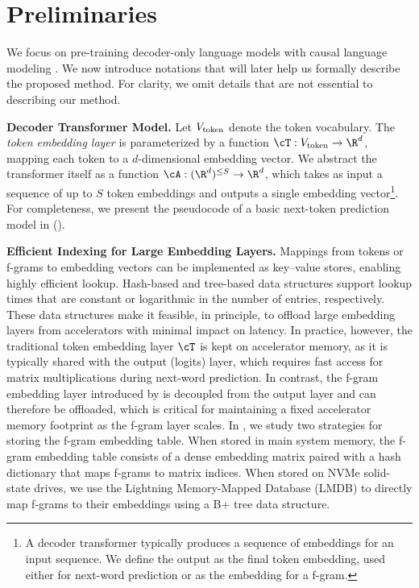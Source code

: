 


\section{Preliminaries}\label{sec:preliminary}

We focus on pre-training decoder-only language models with causal language modeling \citep{radford2019language}. We now introduce  notations that will later help us formally describe the proposed \SCONE method. For clarity, we omit details that are not essential to describing our method.

\textbf{Decoder Transformer Model.} Let $V_{\mathrm{token}}$ denote the token vocabulary. The \emph{token embedding layer} is parameterized by a function $\cT : \Vtoken \to \R^d$, mapping each token to a $d$-dimensional embedding vector.
We abstract the transformer itself as a function $\cA : (\R^{d})^{\le S} \to \R^{d}$, which takes as input a sequence of up to $S$ token embeddings and outputs a single embedding vector\footnote{A decoder transformer typically produces a sequence of embeddings for an input sequence. We define the output as the final token embedding, used either for next-word prediction or as the embedding for a f-gram.}.
For completeness, we present the pseudocode of a basic next-token prediction model in  ().

\textbf{Efficient Indexing for Large Embedding Layers.}
Mappings from tokens or f-grams to embedding vectors can be implemented as key--value stores, enabling highly efficient lookup. Hash-based and tree-based data structures support lookup times that are constant or logarithmic in the number of entries, respectively. These data structures make it feasible, in principle, to offload large embedding layers from accelerators with minimal impact on latency. In practice, however, the traditional token embedding layer $\cT$ is kept on accelerator memory, as it is typically shared with the output (logits) layer, which requires fast access for matrix multiplications during next-word prediction. In contrast, the f-gram embedding layer introduced by \SCONE is decoupled from the output layer and can therefore be offloaded, which is critical for maintaining a fixed accelerator memory footprint as the f-gram layer scales. In , we study two strategies for storing the f-gram embedding table. When stored in main system memory, the f-gram embedding table consists of a dense embedding matrix paired with a hash dictionary that maps f-grams to matrix indices. When stored on NVMe solid-state drives, we use the Lightning Memory-Mapped Database (LMDB) \citep{lmdb} to directly map f-grams to their embeddings using a B+ tree data structure.